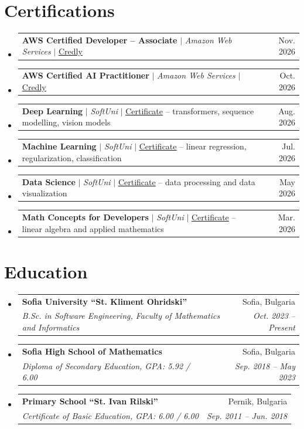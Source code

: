 \documentclass[a4paper,11pt]{article}
\makeatletter
\newcommand{\resumeSubheading}[4]{
  \vspace{-2pt}\item
    \begin{tabular*}{0.97\textwidth}[t]{l@{\extracolsep{\fill}}r}
      \textbf{#1} & #2 \\
      \textit{\small#3} & \textit{\small #4} \\
    \end{tabular*}\vspace{-7pt}
}
\newcommand{\resumeSubHeadingListStart}{\begin{itemize}[leftmargin=0.15in, label={}]}
\newcommand{\resumeSubHeadingListEnd}{\end{itemize}}
\newcommand{\resumeCert}[2]{
    \item
    \begin{tabular*}{0.97\textwidth}{l@{\extracolsep{\fill}}r}
      \small#1 & \small #2 \\
    \end{tabular*}\vspace{-9pt}
}
\makeatother
\begin{document}
\section{Certifications}
  \resumeSubHeadingListStart
    \resumeCert
      {\textbf{AWS Certified Developer -- Associate} $|$ \emph{Amazon Web Services} $|$ \href{https://www.credly.com/badges/450f8da6-c5b3-458b-a46e-c1adcd34fdff}{\underline{Credly}}}
      {Nov. 2026}
    \resumeCert
      {\textbf{AWS Certified AI Practitioner} $|$ \emph{Amazon Web Services} $|$ \href{https://www.credly.com/badges/1a5e28b6-7025-430b-995b-46ed51056673}{\underline{Credly}}}
      {Oct. 2026}
    \resumeCert
      {\textbf{Deep Learning} $|$ \emph{SoftUni} $|$ \href{https://softuni.bg/certificates/details/264893/8dd04aec}{\underline{Certificate}} -- transformers, sequence modelling, vision models}
      {Aug. 2026}
    \resumeCert
      {\textbf{Machine Learning} $|$ \emph{SoftUni} $|$ \href{https://softuni.bg/certificates/details/262691/c3b69aa1}{\underline{Certificate}} -- linear regression, regularization, classification}
      {Jul. 2026}
    \resumeCert
      {\textbf{Data Science} $|$ \emph{SoftUni} $|$ \href{https://softuni.bg/certificates/details/261258/bfeeab9f}{\underline{Certificate}} -- data processing and data visualization}
      {May 2026}
    \resumeCert
      {\textbf{Math Concepts for Developers} $|$ \emph{SoftUni} $|$ \href{https://softuni.bg/certificates/details/258640/cf6e49c3}{\underline{Certificate}} -- linear algebra and applied mathematics}
      {Mar. 2026}
  \resumeSubHeadingListEnd
  \vspace{2pt}


\section{Education}
  \resumeSubHeadingListStart
    \resumeSubheading
      {Sofia University ``St. Kliment Ohridski''}{Sofia, Bulgaria}
      {B.Sc. in Software Engineering, Faculty of Mathematics and Informatics}{Oct. 2023 -- Present}
    \resumeSubheading
      {Sofia High School of Mathematics}{Sofia, Bulgaria}
      {Diploma of Secondary Education, GPA: 5.92 / 6.00}{Sep. 2018 -- May 2023}
    \resumeSubheading
      {Primary School ``St. Ivan Rilski''}{Pernik, Bulgaria}
      {Certificate of Basic Education, GPA: 6.00 / 6.00}{Sep. 2011 -- Jun. 2018}
  \resumeSubHeadingListEnd
  \vspace{2pt}


\end{document}

